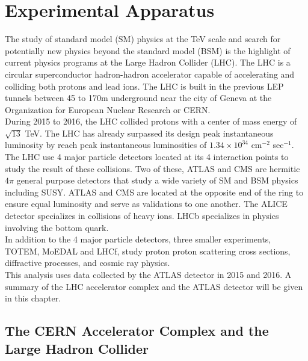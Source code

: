\chapter{Experimental Apparatus}
\label{chap:Exp}

\indent The study of standard model (SM) physics at the TeV scale and search for potentially new physics beyond the standard model (BSM) is the highlight of current physics programs at the Large Hadron Collider (LHC).  The LHC is a circular superconductor hadron-hadron accelerator capable of accelerating and colliding both protons and lead ions.  The LHC is built in the previous LEP tunnels between 45 to 170m underground near the city of Geneva at the Organization for European Nuclear Research or CERN. \\

\indent During 2015 to 2016, the LHC collided protons with a center of mass energy of $\sqrt{13}$ TeV.  The LHC has already surpassed its design peak instantaneous luminosity by reach peak instantaneous luminosities of $1.34 \times 10^{34}$ cm$^{-2}$ sec$^{-1}$.  \\

\indent The LHC use 4 major particle detectors located at its 4 interaction points to study the result of these collisions.  Two of these, ATLAS and CMS are hermitic $4\pi$ general purpose detectors that study a wide variety of SM and BSM physics including SUSY.  ATLAS and CMS are located at the opposite end of the ring to ensure equal luminosity and serve as validations to one another.  The ALICE detector specializes in collisions of heavy ions. LHCb specializes in physics involving the bottom quark. \\

\indent In addition to the 4 major particle detectors, three smaller experiments, TOTEM, MoEDAL and LHCf, study proton proton scattering cross sections, diffractive processes, and cosmic ray physics.  ~\\

\indent This analysis uses data collected by the ATLAS detector in 2015 and 2016.  A summary of the LHC accelerator complex and the ATLAS detector will be given in this chapter. \\

\section{The CERN Accelerator Complex and the Large Hadron Collider}

